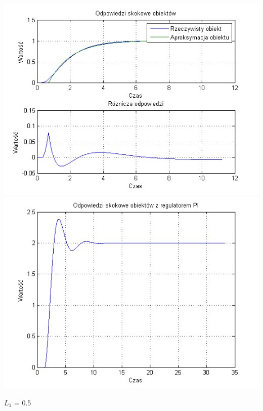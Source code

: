 \documentclass[10pt,a4paper]{article}
\begin{document}
\begin{center}
\includegraphics[scale=1]{images/jeden/skrypt_161.png}\\
\includegraphics[scale=1]{images/jeden/skrypt_162.png}\\
\end{center}
\newpage
$L_1$ = 0.5
\end{document}
